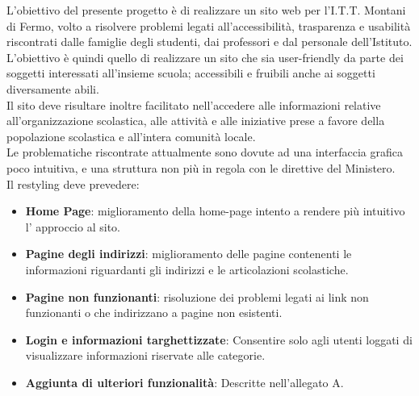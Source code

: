 \documentclass{article}
\begin{document}
	\begin{flushleft}

		L'obiettivo del presente progetto è di realizzare un sito web per l'I.T.T. Montani di Fermo, volto a risolvere problemi legati all'accessibilità, trasparenza e usabilità riscontrati dalle famiglie degli studenti, dai professori e dal personale dell'Istituto. \\
		L'obiettivo è quindi quello di realizzare un sito che sia user-friendly da parte dei soggetti interessati all'insieme scuola; accessibili e fruibili anche ai soggetti diversamente abili.\\
		Il sito deve risultare inoltre facilitato nell'accedere alle informazioni relative all'organizzazione scolastica, alle attività e alle iniziative prese a favore della popolazione scolastica e all'intera comunità locale.\\
		Le problematiche riscontrate attualmente sono dovute ad una interfaccia grafica poco intuitiva, e una struttura non più in regola con le direttive del Ministero.   \\

		Il restyling deve prevedere:

		\begin{itemize}

			\item \textbf{Home Page}: miglioramento della home-page intento a rendere più intuitivo l' approccio al sito. 

			\item \textbf{Pagine degli indirizzi}: miglioramento delle pagine contenenti le informazioni riguardanti gli indirizzi e le articolazioni scolastiche.

			\item \textbf{Pagine non funzionanti}: risoluzione dei problemi legati ai link non funzionanti o che indirizzano a pagine non esistenti.

			\item \textbf{Login e informazioni targhettizzate}: Consentire solo agli utenti loggati di visualizzare informazioni riservate alle categorie.

			\item \textbf{Aggiunta di ulteriori funzionalità}: Descritte nell'allegato A.

			

		\end{itemize}

		\vspace{2mm}

		


\end{flushleft}
\end{document}

